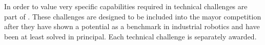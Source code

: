 
In order to value very specific capabilities required in \RCAW technical challenges are part of \RCAW.
These challenges are designed to be included into the mayor competition after they have shown a potential as a benchmark in industrial robotics and have been at least solved in principal.
Each technical challenge is separately awarded. %



